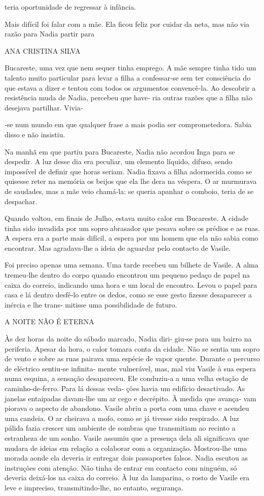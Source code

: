 teria oportunidade de regressar à infância.

Mais difícil foi falar com a mãe. Ela ficou feliz por cuidar da neta,
mas não via razão para Nadia partir para

ANA CRISTINA SILVA

Bucareste, uma vez que nem sequer tinha emprego. A mãe sempre tinha tido
um talento muito particular para levar a filha a confessar‑se sem ter
consciência do que estava a dizer e tentou com todos os argumentos
convencê‑la. Ao descobrir a resistência muda de Nadia, percebeu que
have‑ ria outras razões que a filha não desejava partilhar. Vivia‑

‑se num mundo em que qualquer frase a mais podia ser comprometedora.
Sabia disso e não insistiu.

Na manhã em que partiu para Bucareste, Nadia não acordou Inga para se
despedir. A luz desse dia era peculiar, um elemento líquido, difuso,
sendo impossível de definir que horas seriam. Nadia fixava a filha
adormecida como se quisesse reter na memória os beijos que ela lhe dera
na véspera. O ar murmurava de saudades, mas a mãe veio chamá‑la: se
queria apanhar o comboio, teria de se despachar.

Quando voltou, em finais de Julho, estava muito calor em Bucareste. A
cidade tinha sido invadida por um sopro abrasador que pesava sobre os
prédios e as ruas. A espera era a parte mais difícil, a espera por um
homem que ela não sabia como encontrar. Mas agradava‑lhe a ideia de
aguardar pelo contacto de Vasile.

Foi preciso apenas uma semana. Uma tarde recebeu um bilhete de Vasile. A
alma tremeu‑lhe dentro do corpo quando encontrou um pequeno pedaço de
papel na caixa do correio, indicando uma hora e um local de encontro.
Levou o papel para casa e lá dentro desfê‑lo entre os dedos, como se
esse gesto fizesse desaparecer a inércia e lhe trans‑ mitisse uma
possibilidade de futuro.

A NOITE NÃO É ETERNA

Às dez horas da noite do sábado marcado, Nadia diri‑ giu‑se para um
bairro na periferia. Apesar da hora, o calor tomara conta da cidade. Não
se sentia um sopro de vento e sobre as ruas pairava uma espécie de vapor
quente. Durante o percurso de eléctrico sentiu‑se infinita‑ mente
vulnerável, mas, mal viu Vasile à sua espera numa esquina, a sensação
desapareceu. Ele conduziu‑a a uma velha estação de caminho‑de‑ferro.
Para lá dessas veda‑ ções havia um edifício desactivado. As janelas
entaipadas davam‑lhe um ar cego e decrépito. À medida que avança‑ vam
piorava o aspecto de abandono. Vasile abriu a porta com uma chave e
acendeu uma candeia. O ar cheirava a mofo, como se já tivesse sido
respirado. A luz pálida fazia crescer um ambiente de sombras que
transmitiam ao recinto a estranheza de um sonho. Vasile assumiu que a
presença dela ali significava que mudara de ideias em relação a
colaborar com a organização. Mostrou‑lhe uma morada aonde ela deveria ir
entregar dois passaportes falsos. Nadia escutou as instruções com
atenção. Não tinha de entrar em contacto com ninguém, só deveria
deixá‑los na caixa do correio. À luz da lamparina, o rosto de Vasile era
leve e impreciso, transmitindo‑lhe, no entanto, segurança.


